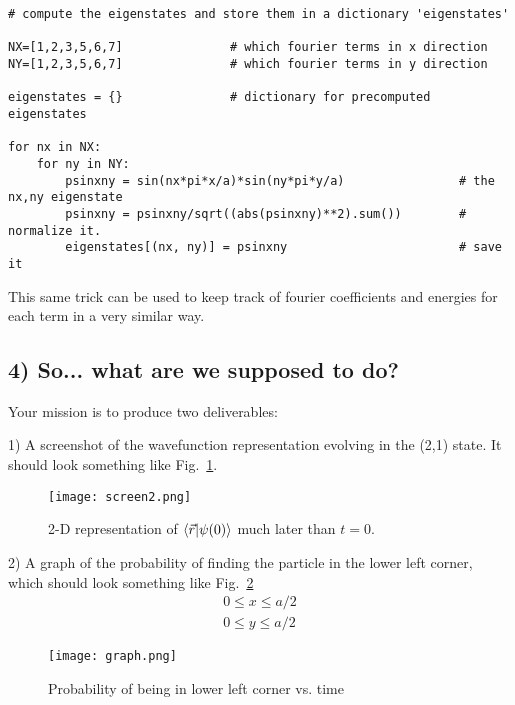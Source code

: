 \documentclass[11pt]{article} %
\begin{document}
\begin{verbatim}
# compute the eigenstates and store them in a dictionary 'eigenstates'

NX=[1,2,3,5,6,7]               # which fourier terms in x direction
NY=[1,2,3,5,6,7]               # which fourier terms in y direction

eigenstates = {}               # dictionary for precomputed eigenstates

for nx in NX:
    for ny in NY:
        psinxny = sin(nx*pi*x/a)*sin(ny*pi*y/a)                # the nx,ny eigenstate
        psinxny = psinxny/sqrt((abs(psinxny)**2).sum())        # normalize it.
        eigenstates[(nx, ny)] = psinxny                        # save it

\end{verbatim}

This same trick can be used to keep track of fourier coefficients and energies for each term in a very similar way.

\subsection*{4) So... what are we supposed to do?}

Your mission is to produce two deliverables:

1) A screenshot of the wavefunction representation evolving in the (2,1) state. It should look something like Fig.~\ref{fig:evolvedstate}.

\begin{figure}[htbp] %
   \centering
   \texttt{[image: screen2.png]} 
   \caption{2-D representation of $\braket{\vec{r}|\psi(0)}$ much later than $t=0$.}
   \label{fig:evolvedstate}
\end{figure}

2) A graph of the probability of finding the particle in the lower left corner, which should look something like Fig.~\ref{fig:graph}
\begin{eqnarray}
0 \le x\le a/2\\
0 \le y\le a/2
\end{eqnarray}

\begin{figure}[htbp] %
   \centering
   \texttt{[image: graph.png]} 
   \caption{Probability of being in lower left corner vs. time}
   \label{fig:graph}
\end{figure}
\end{document}
